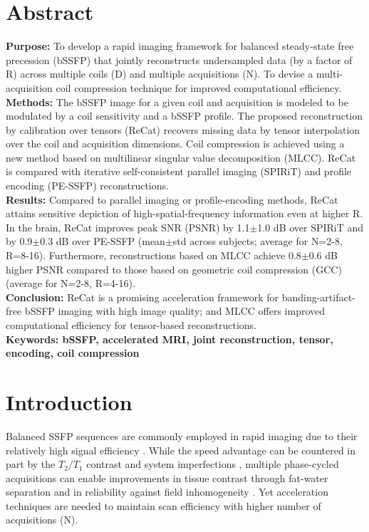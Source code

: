 \documentclass[11pt, onecolumn]{article}
\begin{document}
\section*{Abstract}
\setlength{\parindent}{0in}
\textbf{Purpose:} To develop a rapid imaging framework for balanced steady-state free precession (bSSFP) that jointly reconstructs undersampled data (by a factor of R) across multiple coils (D) and multiple acquisitions (N). To devise a multi-acquisition coil compression technique for improved computational efficiency. \\
\textbf{Methods:} The bSSFP image for a given coil and acquisition is modeled to be modulated by a coil sensitivity and a bSSFP profile. The proposed reconstruction by calibration over tensors (ReCat) recovers missing data by tensor interpolation over the coil and acquisition dimensions. Coil compression is achieved using a new method based on multilinear singular value decomposition (MLCC). ReCat is compared with iterative self-consistent parallel imaging (SPIRiT) and profile encoding (PE-SSFP) reconstructions. \\
\textbf{Results:} Compared to parallel imaging or profile-encoding methods, ReCat attains sensitive depiction of high-spatial-frequency information even at higher R. In the brain, ReCat improves peak SNR (PSNR) by 1.1$\pm$1.0 dB over SPIRiT and by 0.9$\pm$0.3 dB over PE-SSFP (mean$\pm$std across subjects; average for N=2-8, R=8-16). Furthermore, reconstructions based on MLCC achieve 0.8$\pm$0.6 dB higher PSNR compared to those based on geometric coil compression (GCC) (average for N=2-8, R=4-16). \\
\textbf{Conclusion:} ReCat is a promising acceleration framework for banding-artifact-free bSSFP imaging with high image quality; and MLCC offers improved computational efficiency for tensor-based reconstructions. \\

\vspace{0.5in}
\setlength{\parindent}{0in}
{\bf Keywords: bSSFP, accelerated MRI, joint reconstruction, tensor, encoding, coil compression}

\clearpage

\section*{Introduction}
Balanced SSFP sequences are commonly employed in rapid imaging due to their relatively high signal efficiency \cite{SchefflerEur}. While the speed advantage can be countered in part by the $T_2/T_1$ contrast and system imperfections \cite{Bieri05,Bangerter04}, multiple phase-cycled acquisitions can enable improvements in tissue contrast through fat-water separation \cite{Hargreaves:2006bn, ATRDIXON, Cukur:2009do} and in reliability against field inhomogeneity \cite{Bangerter04,Cukur:2007dx,Elliott07,Quist:2012kx}. Yet acceleration techniques are needed to maintain scan efficiency with higher number of acquisitions (N). 
\end{document}
